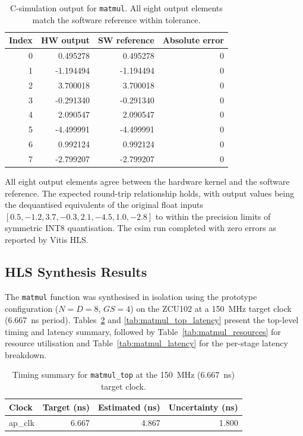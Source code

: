 \begin{table}[H]
  \centering
  \begin{tabular}{rrrr}
    \toprule
    Index & HW output & SW reference & Absolute error \\
    \midrule
    0 &  0.495278 &  0.495278 & 0 \\
    1 & -1.194494 & -1.194494 & 0 \\
    2 &  3.700018 &  3.700018 & 0 \\
    3 & -0.291340 & -0.291340 & 0 \\
    4 &  2.090547 &  2.090547 & 0 \\
    5 & -4.499991 & -4.499991 & 0 \\
    6 &  0.992124 &  0.992124 & 0 \\
    7 & -2.799207 & -2.799207 & 0 \\
    \bottomrule
  \end{tabular}
  \caption{C-simulation output for \texttt{matmul}.
           All eight output elements match the software reference within
           tolerance.}
  \label{tab:matmul_csim}

\end{table}

All eight output elements agree between the hardware kernel and
the software reference. The expected round-trip relationship holds, with
output values being the dequantised equivalents of the original float inputs
$[0.5, -1.2, 3.7, -0.3, 2.1, -4.5, 1.0, -2.8]$ to within the precision
limits of symmetric INT8 quantisation. The csim run completed with zero errors as reported by
Vitis HLS.

\subsection{HLS Synthesis Results}
\label{subsec:matmul_csyn}

The \texttt{matmul} function was synthesised in isolation using the
prototype configuration ($N = D = 8$, $GS = 4$) on the ZCU102
at a \SI{150}{\mega\hertz} target clock (\SI{6.667}{\nano\second} period).
Tables~\ref{tab:matmul_timing} and \ref{tab:matmul_top_latency} present
the top-level timing and latency summary, followed by
Table~\ref{tab:matmul_resources} for resource utilisation and
Table~\ref{tab:matmul_latency} for the per-stage latency breakdown.

\begin{table}[H]
  \centering
  \begin{tabular}{lrrr}
    \toprule
    Clock   & Target (ns) & Estimated (ns) & Uncertainty (ns) \\
    \midrule
    ap\_clk & 6.667       & 4.867          & 1.800 \\
    \bottomrule
  \end{tabular}
  \caption{Timing summary for \texttt{matmul\_top} at the
           \SI{150}{\mega\hertz} (\SI{6.667}{\nano\second}) target clock.}
  \label{tab:matmul_timing}

\end{table}

